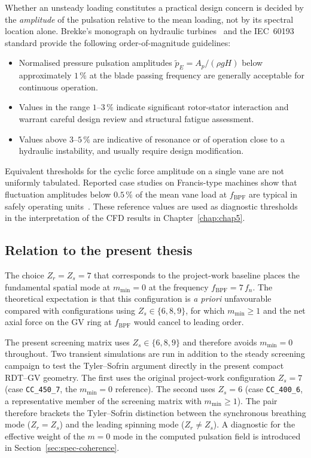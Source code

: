 Whether an unsteady loading constitutes a practical design concern is decided by the \emph{amplitude} of the pulsation relative to the mean loading, not by its spectral location alone. Brekke's monograph on hydraulic turbines~\cite{Brekke2015,Brekke2010} and the IEC~60193 standard provide the following order-of-magnitude guidelines:
\begin{itemize}
  \item Normalised pressure pulsation amplitudes $\tilde{p}_{E} = A_p / (\rho g H)$ below approximately $1\,\%$ at the blade passing frequency are generally acceptable for continuous operation.
  \item Values in the range $1$--$3\,\%$ indicate significant rotor-stator interaction and warrant careful design review and structural fatigue assessment.
  \item Values above $3$--$5\,\%$ are indicative of resonance or of operation close to a hydraulic instability, and usually require design modification.
\end{itemize}
Equivalent thresholds for the cyclic force amplitude on a single vane are not uniformly tabulated. Reported case studies on Francis-type machines show that fluctuation amplitudes below $0.5\,\%$ of the mean vane load at $f_{\mathrm{BPF}}$ are typical in safely operating units~\cite{Egusquiza2006}. These reference values are used as diagnostic thresholds in the interpretation of the CFD results in Chapter~\ref{chap:chap5}.
 
\subsection{Relation to the present thesis}
\label{sec:rsi-thesis}
 
The choice $Z_r = Z_s = 7$ that corresponds to the project-work baseline places the fundamental spatial mode at $m_{\min} = 0$ at the frequency $f_{\mathrm{BPF}} = 7\,f_n$. The theoretical expectation is that this configuration is \emph{a priori} unfavourable compared with configurations using $Z_s \in \{6,8,9\}$, for which $m_{\min} \geq 1$ and the net axial force on the GV ring at $f_{\mathrm{BPF}}$ would cancel to leading order.
 
The present screening matrix uses $Z_s \in \{6,8,9\}$ and therefore avoids $m_{\min}=0$ throughout. Two transient simulations are run in addition to the steady screening campaign to test the Tyler--Sofrin argument directly in the present compact RDT--GV geometry. The first uses the original project-work configuration $Z_s = 7$ (case \texttt{CC\_450\_7}, the $m_{\min}=0$ reference). The second uses $Z_s = 6$ (case \texttt{CC\_400\_6}, a representative member of the screening matrix with $m_{\min} \geq 1$). The pair therefore brackets the Tyler--Sofrin distinction between the synchronous breathing mode ($Z_r=Z_s$) and the leading spinning mode ($Z_r\neq Z_s$). A diagnostic for the effective weight of the $m=0$ mode in the computed pulsation field is introduced in Section~\ref{sec:spec-coherence}.

